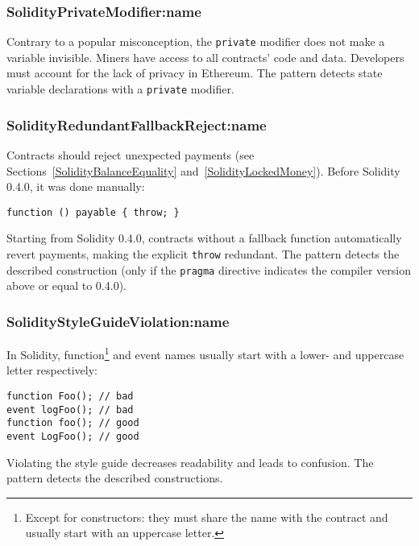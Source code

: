 \subsubsection{\usevalue SolidityPrivateModifier:name } \label{SolidityPrivateModifier}

Contrary to a popular misconception, the \texttt{private} modifier does not make a variable invisible.
Miners have access to all contracts' code and data.
Developers must account for the lack of privacy in Ethereum.
The pattern detects state variable declarations with a \texttt{private} modifier.

\subsubsection{\usevalue SolidityRedundantFallbackReject:name } \label{SolidityRedundantFallbackReject}

Contracts should reject unexpected payments (see Sections~\ref{SolidityBalanceEquality} and~\ref{SolidityLockedMoney}).
Before Solidity 0.4.0, it was done manually:
\begin{lstlisting}[language=Solidity]
function () payable { throw; }
\end{lstlisting}
Starting from Solidity 0.4.0, contracts without a fallback function automatically revert payments, making the explicit \texttt{throw} redundant.
The pattern detects the described construction (only if the \texttt{pragma} directive indicates the compiler version above or equal to 0.4.0).


\subsubsection{\usevalue SolidityStyleGuideViolation:name } \label{SolidityStyleGuideViolation}

In Solidity, function\footnote{Except for constructors: they must share the name with the contract and usually start with an uppercase letter.} and event names usually start with a lower- and uppercase letter respectively:
\begin{lstlisting}[language=Solidity]
function Foo(); // bad
event logFoo(); // bad
function foo(); // good
event LogFoo(); // good
\end{lstlisting}
Violating the style guide decreases readability and leads to confusion.
The pattern detects the described constructions.

